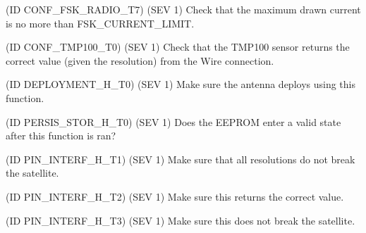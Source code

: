 \begin{DoxyRefList}
(ID C\+O\+N\+F\+\_\+\+F\+S\+K\+\_\+\+R\+A\+D\+I\+O\+\_\+\+T7) (S\+EV 1) Check that the maximum drawn current is no more than F\+S\+K\+\_\+\+C\+U\+R\+R\+E\+N\+T\+\_\+\+L\+I\+M\+IT. 
\item[\label{test__test000023}%
\Hypertarget{test__test000023}%
Module \hyperlink{group__defines__tmp100__configuration}{defines\+\_\+tmp100\+\_\+configuration} ](ID C\+O\+N\+F\+\_\+\+T\+M\+P100\+\_\+\+T0) (S\+EV 1) Check that the T\+M\+P100 sensor returns the correct value (given the resolution) from the Wire connection. 
\item[\label{test__test000031}%
\Hypertarget{test__test000031}%
Global \hyperlink{deployment_8h_acf81803b5f0482964a9c550f249fc3cf}{Deployment\+\_\+\+Deploy} ()](ID D\+E\+P\+L\+O\+Y\+M\+E\+N\+T\+\_\+\+H\+\_\+\+T0) (S\+EV 1) Make sure the antenna deploys using this function. 
\item[\label{test__test000032}%
\Hypertarget{test__test000032}%
Global \hyperlink{persistent__storage_8h_a639d33b8a97eee3ccfaf9b7c00537cac}{Persistent\+\_\+\+Storage\+\_\+\+Wipe} ()](ID P\+E\+R\+S\+I\+S\+\_\+\+S\+T\+O\+R\+\_\+\+H\+\_\+\+T0) (S\+EV 1) Does the E\+E\+P\+R\+OM enter a valid state after this function is ran? 
\item[\label{test__test000034}%
\Hypertarget{test__test000034}%
Global \hyperlink{pin__interface_8h_a19d8eea2c4cc2711fb370569770ea4e7}{Pin\+\_\+\+Interface\+\_\+\+Read\+\_\+\+Temperature} (uint8\+\_\+t sensor\+Addr)](ID P\+I\+N\+\_\+\+I\+N\+T\+E\+R\+F\+\_\+\+H\+\_\+\+T1) (S\+EV 1) Make sure that all resolutions do not break the satellite. 

(ID P\+I\+N\+\_\+\+I\+N\+T\+E\+R\+F\+\_\+\+H\+\_\+\+T2) (S\+EV 1) Make sure this returns the correct value. 
\item[\label{test__test000035}%
\Hypertarget{test__test000035}%
Global \hyperlink{pin__interface_8h_ad2aae71d01b9b9cdf1f12cb22b820781}{Pin\+\_\+\+Interface\+\_\+\+Read\+\_\+\+Temperature\+\_\+\+Internal} ()](ID P\+I\+N\+\_\+\+I\+N\+T\+E\+R\+F\+\_\+\+H\+\_\+\+T3) (S\+EV 1) Make sure this does not break the satellite. 


\end{DoxyRefList}
